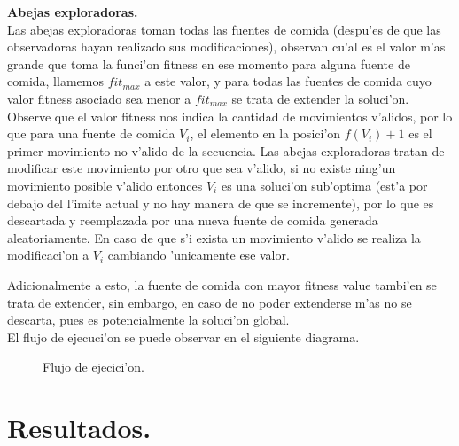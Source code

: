 \documentclass[12pt]{article}
\begin{document}
    \textbf{Abejas exploradoras.}\\
    Las abejas exploradoras toman todas las fuentes de comida (despu'es de que las observadoras hayan realizado
    sus modificaciones), observan cu'al es el valor m'as grande que toma la funci'on fitness en ese momento para alguna fuente
    de comida,
    llamemos $fit_{max}$ a este valor, y para todas las fuentes de comida cuyo
    valor fitness asociado sea menor a $fit_{max}$ se trata de extender la soluci'on.\\
    Observe que el valor fitness nos indica la cantidad de movimientos v'alidos, por lo que
    para una fuente de comida $V_i$, el elemento en la posici'on $f(V_i) + 1$
    es el primer movimiento no v'alido de la secuencia. Las abejas exploradoras tratan de modificar
    este movimiento por otro que sea v'alido, si no existe ning'un movimiento posible v'alido
    entonces $V_i$ es una soluci'on sub'optima (est'a por debajo del l'imite actual y no hay manera
    de que se incremente), por lo que es descartada y reemplazada por una nueva
    fuente de comida generada aleatoriamente. En caso de que s'i exista un movimiento v'alido se realiza la
    modificaci'on a $V_i$ cambiando 'unicamente ese valor.

    Adicionalmente a esto, la fuente de comida con mayor fitness value tambi'en se trata de extender, sin embargo, en caso de no poder extenderse m'as no se descarta, pues
    es potencialmente la soluci'on global.\\


    El flujo de ejecuci'on se puede observar en el siguiente diagrama.

    \begin{figure}[H]
        \centering
        \caption{Flujo de ejecici'on.}
        \label{fig:flujo}
    \end{figure}




    \section{Resultados.}
\end{document}
